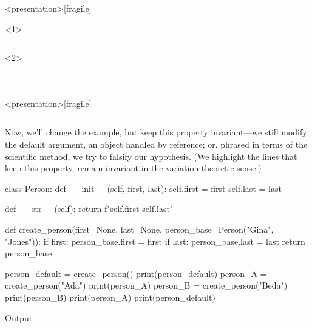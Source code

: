 \begin{description}
    \begin{frame}<presentation>[fragile]
      \begin{example}[experiment2.py]
        \begin{onlyenv}<1>
          \inputminted[firstline=1,lastline=13]{python}{examples/experiment2.py}
        \end{onlyenv}
        \begin{onlyenv}<2>
          \inputminted[firstline=1,lastline=2]{python}{examples/experiment2.py}
          \inputminted[firstline=9,lastline=10]{python}{examples/experiment2.py}
          \inputminted[firstline=14]{python}{examples/experiment2.py}
        \end{onlyenv}
      \end{example}
    \end{frame}

    \begin{frame}<presentation>[fragile]
      \begin{example}[experiment3.py]
      \inputminted{python}{examples/experiment3.py}
      \end{example}
    \end{frame}

    Now, we'll change the example, but keep this property invariant---we
    still modify the default argument, an object handled by reference;
    or, phrased in terms of the scientific method, we try to falsify our
    hypothesis.
    (We highlight the lines that keep this property, \ie remain invariant in
    the variation theoretic sense.)
    \begin{frame}[fragile]
    \begin{pyblock}[default1][highlightlines={10-12}]
class Person:
  def __init__(self, first, last):
    self.first = first
    self.last = last

  def __str__(self):
    return f"{self.first} {self.last}"

def create_person(first=None, last=None,
                  person_base=Person("Gina", "Jones")):
  if first: person_base.first = first
  if last: person_base.last = last
  return person_base

person_default = create_person()
print(person_default)
person_A = create_person("Ada")
print(person_A)
person_B = create_person("Beda")
print(person_B)
print(person_A)
print(person_default)
    \end{pyblock}
    \begin{block}{Output}\printpythontex[verbatim][highlightlines={4-5}]\end{block}
    \end{frame}


\end{description}
